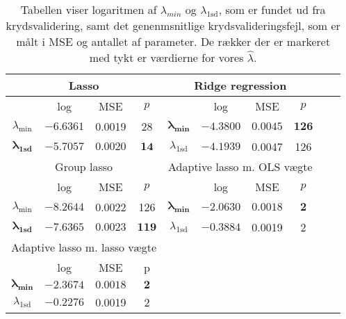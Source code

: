 \begin{table}
\center
\begin{tabular}{cccc | cccccc}
\toprule
   \multicolumn{4}{c}{Lasso} &  \multicolumn{4}{c}{Ridge regression}  \\ \midrule
 & log & MSE & $p$ & & log & MSE & $p$ \\
 $\lambda_{\min}$ &$-6.6361$& 0.0019 & 28 &	$\boldsymbol{\lambda_{\min}}$ &  $\mathbf{-4.3800}$ &   $\mathbf{0.0045} $&  $\mathbf{126}$ \\ 
 $\boldsymbol{\lambda}_{\textbf{1sd}}$ & $\mathbf{-5.7057}$ & $\mathbf{0.0020} $& $\mathbf{14}$ & $\lambda_{ \text{1sd}}$& $-4.1939$ & 0.0047 & 126  \\ \bottomrule \toprule
\multicolumn{4}{c}{Group lasso}  &  \multicolumn{4}{c}{Adaptive lasso m. OLS vægte}  \\ \midrule
& log & MSE &$ p $ && log & MSE & $p$ &  \\
$\lambda_{\min}$& $-8.2644$ & 0.0022  & 126 & $\boldsymbol{\lambda_{\min}}$  & $\mathbf{-2.0630}$ &$ \mathbf{0.0018}$ & $\mathbf{2}$ \\
  $\boldsymbol{\lambda}_{\textbf{1sd}}$  & $\mathbf{-7.6365}$ &$ \mathbf{0.0023}$ & $\mathbf{119}$ &  $\lambda_{1\text{sd}}$ & $-0.3884$ & 0.0019 & 2 \\  \bottomrule 
  \toprule
  \multicolumn{4}{c}{Adaptive lasso m. lasso vægte}  \\ \cmidrule{1-4}
& log & MSE & p \\
$\boldsymbol{\lambda_{\min}}$   &  $ \mathbf{-2.3674}$ & $ \mathbf{0.0018} $& $ \mathbf{2}$   \\
$\lambda_{1\text{sd}}$  & $-0.2276$ & 0.0019 & 2  \\ \cmidrule{1-4}
 \end{tabular}
\caption{Tabellen viser logaritmen af $\lambda_{min}$ og $\lambda_{1\text{sd}}$, som er  fundet ud fra krydsvalidering, samt det genenmsnitlige krydsvalideringsfejl, som er målt i MSE og antallet af parameter. De rækker der er markeret med tykt er værdierne for vores $\widehat{\lambda}$.} \label{tab:cv_tab}
\end{table}
